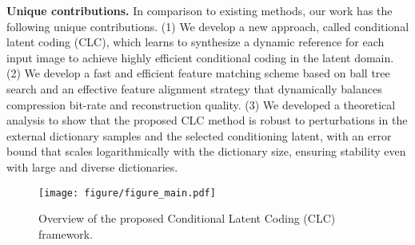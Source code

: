 \textbf{Unique contributions.} 
In comparison to existing methods, our work has the following unique contributions. (1) We develop a new approach, called conditional latent coding (CLC), which learns to synthesize a dynamic reference for each input image to achieve highly efficient conditional coding in the latent domain. 
(2) We develop a fast and efficient feature matching scheme based on ball tree search and an effective feature alignment strategy that dynamically balances compression bit-rate and reconstruction quality. (3) We developed a theoretical analysis to show that the proposed CLC method is robust to perturbations in the external dictionary samples and the selected conditioning latent, with an error bound that scales logarithmically with the dictionary size, ensuring stability even with large and diverse dictionaries.

\begin{figure}[tb]
    \centering
    \texttt{[image: figure/figure\_main.pdf]}
    \caption{Overview of the proposed Conditional Latent Coding (CLC) framework.}
    \label{fig:main0810}
\end{figure}